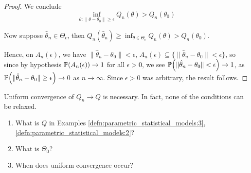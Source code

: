 \begin{proof}
  We conclude
  \begin{equation}
    \label{eq:36}
    \inf_{\theta: \|\theta - \theta_{0} \| \geq \epsilon}
    Q_{n}(\theta) > Q_{n}(\theta_{0})
  \end{equation}

  Now suppose $\hat \theta_{n} \in \Theta_{\epsilon}$, then
  $Q_{n}(\hat \theta_{n}) \geq \inf_{\theta \in \Theta_{\epsilon}}
  Q_{n}(\theta) > Q_{n}(\theta_{0})$.

  Hence, on $A_{n}(\epsilon)$, we have $\| \hat \theta_{n} -
  \theta_{0}\| < \epsilon$, $A_{n}(\epsilon) \subseteq \{ \| \hat
  \theta_{n} - \theta_{0} \| < \epsilon \}$, so since by hypothesis
  $\Prob{A_{n}(\epsilon)} \rightarrow 1$ for all $\epsilon > 0$, we
  see $\Prob{\| \hat \theta_{n} - \theta_{0} \| < \epsilon}
  \rightarrow 1$, as $\Prob{\| \hat \theta_{n} - \theta_{0} \| \geq
    \epsilon} \rightarrow 0$ as $n \rightarrow \infty$. Since
  $\epsilon > 0$ was arbitrary, the result follows.
\end{proof}

\begin{remark}
  Uniform convergence of $Q_{n} \rightarrow Q$ is necessary. In fact,
  none of the conditions can be relaxed.
\end{remark}

\begin{exer}
  \begin{enumerate}
  \item What is $Q$ in Examples
    \ref{defn:parametric_statistical_models:3}, \ref{defn:parametric_statistical_models:2}?
  \item What is $\Theta_{0}$?
  \item When does uniform convergence occur?
  \end{enumerate}
\end{exer}

